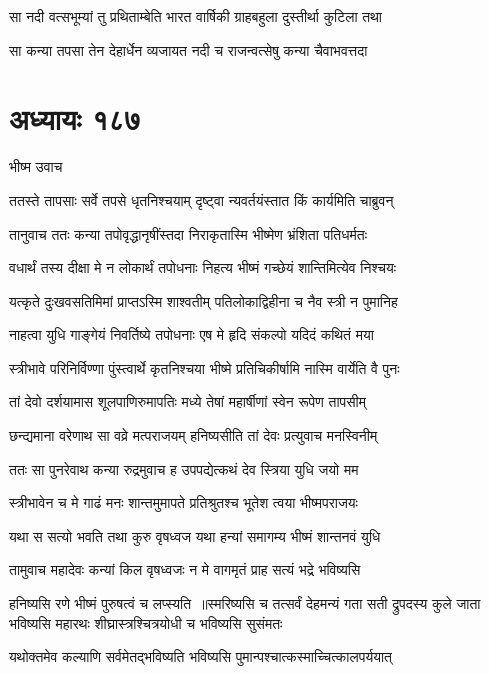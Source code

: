 \twolineshloka
{सा नदी वत्सभूम्यां तु प्रथिताम्बेति भारत}
{वार्षिकी ग्राहबहुला दुस्तीर्था कुटिला तथा}


\twolineshloka
{सा कन्या तपसा तेन देहार्धेन व्यजायत}
{नदी च राजन्वत्सेषु कन्या चैवाभवत्तदा}


\chapter{अध्यायः १८७}
\twolineshloka
{भीष्म उवाच}
{}


\twolineshloka
{ततस्ते तापसाः सर्वे तपसे धृतनिश्चयाम्}
{दृष्ट्वा न्यवर्तयंस्तात किं कार्यमिति चाब्रुवन्}


\twolineshloka
{तानुवाच ततः कन्या तपोवृद्धानृषींस्तदा}
{निराकृतास्मि भीष्मेण भ्रंशिता पतिधर्मतः}


\twolineshloka
{वधार्थं तस्य दीक्षा मे न लोकार्थं तपोधनाः}
{निहत्य भीष्मं गच्छेयं शान्तिमित्येव निश्चयः}


\twolineshloka
{यत्कृते दुःखवसतिमिमां प्राप्तऽस्मि शाश्वतीम्}
{पतिलोकाद्विहीना च नैव स्त्री न पुमानिह}


\twolineshloka
{नाहत्वा युधि गाङ्गेयं निवर्तिष्ये तपोधनाः}
{एष मे हृदि संकल्पो यदिदं कथितं मया}


\twolineshloka
{स्त्रीभावे परिनिर्विण्णा पुंस्त्वार्थे कृतनिश्चया}
{भीष्मे प्रतिचिकीर्षामि नास्मि वार्येति वै पुनः}


\twolineshloka
{तां देवो दर्शयामास शूलपाणिरुमापतिः}
{मध्ये तेषां महार्षीणां स्वेन रूपेण तापसीम्}


\twolineshloka
{छन्द्यमाना वरेणाथ सा वव्रे मत्पराजयम्}
{हनिष्यसीति तां देवः प्रत्युवाच मनस्विनीम्}


\twolineshloka
{ततः सा पुनरेवाथ कन्या रुद्रमुवाच ह}
{उपपद्येत्कथं देव स्त्रिया युधि जयो मम}


\twolineshloka
{स्त्रीभावेन च मे गाढं मनः शान्तमुमापते}
{प्रतिश्रुतश्च भूतेश त्वया भीष्मपराजयः}


\twolineshloka
{यथा स सत्यो भवति तथा कुरु वृषध्वज}
{यथा हन्यां समागम्य भीष्मं शान्तनवं युधि}


\twolineshloka
{तामुवाच महादेवः कन्यां किल वृषध्वजः}
{न मे वागमृतं प्राह सत्यं भद्रे भविष्यसि}


हनिष्यसि रणे भीष्मं पुरुषत्वं च लप्स्यति ॥स्मरिष्यसि च तत्सर्वं देहमन्यं गता सती
\twolineshloka
{द्रुपदस्य कुले जाता भविष्यसि महारथः}
{शीघ्रास्त्रश्चित्रयोधी च भविष्यसि सुसंमतः}


\twolineshloka
{यथोक्तमेव कल्याणि सर्वमेतद्भविष्यति}
{भविष्यसि पुमान्पश्चात्कस्माच्चित्कालपर्ययात्}


